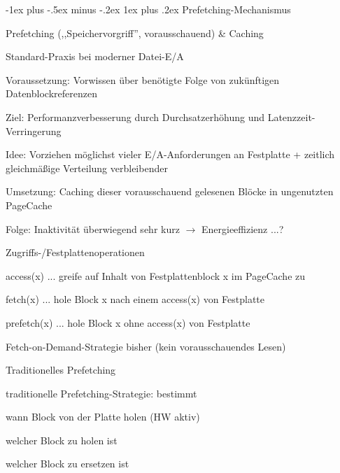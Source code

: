 \documentclass[a4paper]{article}
\makeatletter
\renewcommand{\subsubsection}{\@startsection{subsubsection}{3}{0mm}%
 {-1ex plus -.5ex minus -.2ex}%
 {1ex plus .2ex}%
 {\normalfont\small\bfseries}}
\makeatother
\begin{document}
\begin{multicols}{3}
    \subsubsection{Prefetching-Mechanismus}
    \begin{itemize*}
        \item Prefetching (,,Speichervorgriff'', vorausschauend) \& Caching
        \begin{itemize*}
            \item Standard-Praxis bei moderner Datei-E/A
            \item Voraussetzung: Vorwissen über benötigte Folge von zukünftigen Datenblockreferenzen
            \item Ziel: Performanzverbesserung durch Durchsatzerhöhung und Latenzzeit-Verringerung
            \item Idee: Vorziehen möglichst vieler E/A-Anforderungen an Festplatte + zeitlich gleichmäßige Verteilung verbleibender
            \item Umsetzung: Caching dieser vorausschauend gelesenen Blöcke in ungenutzten PageCache
        \end{itemize*}
        \item Folge: Inaktivität überwiegend sehr kurz $\rightarrow$ Energieeffizienz ...?
        \item Zugriffs-/Festplattenoperationen
        \begin{itemize*}
            \item access(x) ... greife auf Inhalt von Festplattenblock x im PageCache zu
            \item fetch(x) ... hole Block x nach einem access(x) von Festplatte
            \item prefetch(x) ... hole Block x ohne access(x) von Festplatte
        \end{itemize*}
        \item Fetch-on-Demand-Strategie bisher (kein vorausschauendes Lesen)
        \item Traditionelles Prefetching
        \begin{itemize*}
            \item traditionelle Prefetching-Strategie: bestimmt
            \begin{itemize*}
                \item wann Block von der Platte holen (HW aktiv)
                \item welcher Block zu holen ist
                \item welcher Block zu ersetzen ist

\end{itemize*}
\end{itemize*}
\end{itemize*}
\end{multicols}
\end{document}
